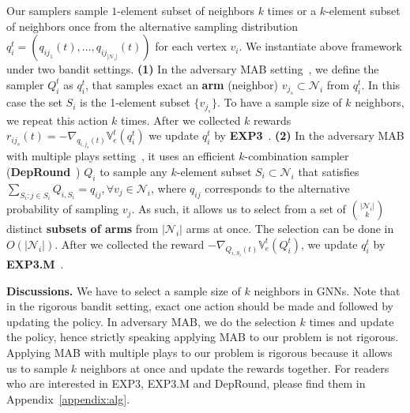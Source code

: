 \documentclass{article}
\begin{document}
Our samplers sample $1$-element subset of neighbors $k$ times  
or a $k$-element subset of neighbors once
from the alternative sampling distribution 
$q_i^t = (q_{ij_1}(t), ..., q_{ij_{|\mathcal{N}_i|}}(t))$
for each vertex $v_i$.
We instantiate above framework under two bandit settings.
\textbf{(1)} In the adversary
MAB setting~\cite{auer2002nonstochastic}, 
we define the sampler $Q_i^t$ as $q_i^t$, that 
samples exact an \textbf{arm} (neighbor) 
$v_{j_s} \subset \mathcal{N}_i$ from $q_i^t$. 
In this case the set $S_i$ is
the 1-element subset $\{v_{j_s}\}$. To have a sample size of $k$
neighbors, we repeat this action $k$ times.
After we collected $k$ rewards
$r_{ij_s}(t) = -\nabla_{q_{i,j_s}(t)}\mathbb{V}_e^t(q_i^t)$ 
we update $q_i^t$ by 
\textbf{EXP3}~\cite{auer2002nonstochastic}.
\textbf{(2)} In the adversary MAB with multiple plays 
setting~\cite{uchiya2010algorithms},
it uses an efficient $k$-combination sampler 
(\textbf{DepRound}~\cite{gandhi2006dependent})
$Q_i$ to sample any $k$-element subset 
$S_i\subset \mathcal{N}_i$ that satisfies
$\sum_{S_i:j\in S_i}Q_{i,S_i}=q_{ij}, \forall v_j\in \mathcal{N}_i$,
where $q_{ij}$ corresponds to the alternative probability
of sampling $v_j$. As such, it allows us
to select from a set of ${|\mathcal{N}_i| \choose k}$
distinct \textbf{subsets of arms}
from $|\mathcal{N}_i|$ arms at once.
The selection can be done in $O(|\mathcal{N}_i|)$. 
After we collected the reward 
$-\nabla_{Q_{i,S_i}(t)}\mathbb{V}_e^t(Q_{i}^t)$,
we update $q_i^t$ by \textbf{EXP3.M}~\cite{uchiya2010algorithms}.

{\bfseries Discussions.} We have to select a sample
size of $k$ neighbors in GNNs. Note that in the 
rigorous bandit setting, exact one action should 
be made and followed by updating
the policy. In adversary MAB, we do the selection $k$ times and 
update the policy, hence strictly speaking applying MAB to our
problem is not rigorous. Applying MAB with multiple plays 
to our problem is rigorous because it allows
us to sample $k$ neighbors at once and update
the rewards together. For readers who are interested in 
EXP3, EXP3.M and DepRound, please find them in 
Appendix~\ref{appendix:alg}.
\end{document}

